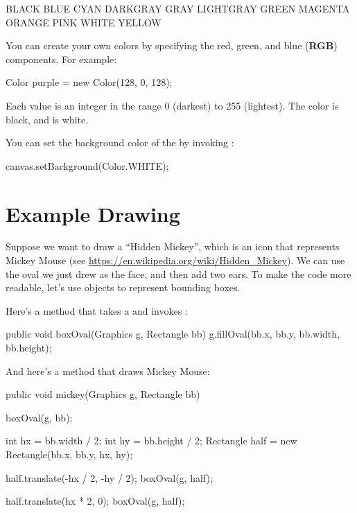 \begin{stdout}
BLACK       BLUE      CYAN     DARKGRAY   GRAY    LIGHTGRAY
GREEN       MAGENTA   ORANGE   PINK       WHITE   YELLOW
\end{stdout}


You can create your own colors by specifying the red, green, and blue ({\bf RGB}) components.
For example:

\begin{code}
Color purple = new Color(128, 0, 128);
\end{code}

Each value is an integer in the range 0 (darkest) to 255 (lightest).
The color  is black, and  is white.

You can set the background color of the  by invoking :

\begin{code}
canvas.setBackground(Color.WHITE);
\end{code}


\section{Example Drawing}


Suppose we want to draw a ``Hidden Mickey'', which is an icon that represents Mickey Mouse (see \url{https://en.wikipedia.org/wiki/Hidden_Mickey}).
We can use the oval we just drew as the face, and then add two ears.
To make the code more readable, let's use  objects to represent bounding boxes.

Here's a method that takes a  and invokes :

\begin{code}
public void boxOval(Graphics g, Rectangle bb) {
    g.fillOval(bb.x, bb.y, bb.width, bb.height);
}
\end{code}

And here's a method that draws Mickey Mouse:

\begin{code}
public void mickey(Graphics g, Rectangle bb) {
    boxOval(g, bb);

    int hx = bb.width / 2;
    int hy = bb.height / 2;
    Rectangle half = new Rectangle(bb.x, bb.y, hx, hy);

    half.translate(-hx / 2, -hy / 2);
    boxOval(g, half);

    half.translate(hx * 2, 0);
    boxOval(g, half);
}
\end{code}

